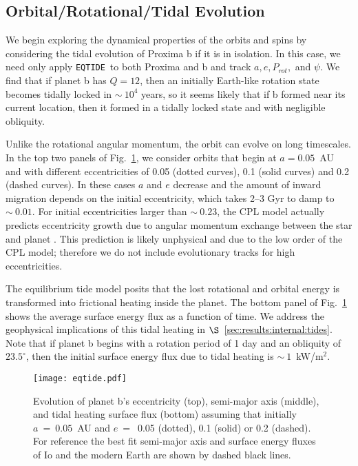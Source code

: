 \documentclass[preprint,12pt]{aastex}
\def\eqtide{\texttt{\footnotesize{EQTIDE}}\xspace}
\begin{document}
\subsection{Orbital/Rotational/Tidal Evolution}
\label{sec:results:orbital}

We begin exploring the dynamical properties of the orbits and spins by
considering the tidal evolution of Proxima b if it is in isolation. In
this case, we need only apply \eqtide~to both Proxima and b and track
$a, e, P_{rot},$ and $\psi$. We find that if planet b has $Q=12$,
then an initially Earth-like rotation state becomes tidally locked in
$\sim~10^4$ years, so it seems likely that if b formed near its
current location, then it formed in a tidally locked state and with
negligible obliquity.

Unlike the rotational angular momentum, the orbit can evolve on long
timescales. In the top two panels of Fig.~\ref{fig:eqtide}, we
consider orbits that begin at $a=0.05$~AU and with different
eccentricities of 0.05 (dotted curves), 0.1 (solid curves) and 0.2
(dashed curves). In these cases $a$ and $e$ decrease and the amount of
inward migration depends on the initial eccentricity, which takes 2--3
Gyr to damp to $\sim~0.01$. For initial eccentricities larger than
$\sim~0.23$, the CPL model actually predicts eccentricity growth due
to angular momentum exchange between the star and planet
\citep{Barnes16}. This prediction is likely unphysical and due to the
low order of the CPL model; therefore we do not include evolutionary
tracks for high eccentricities.

The equilibrium tide model posits that the lost rotational and orbital
energy is transformed into frictional heating inside the planet. The
bottom panel of Fig.~\ref{fig:eqtide} shows the average surface energy
flux as a function of time. We address the geophysical implications of
this tidal heating in $\S$~\ref{sec:results:internal:tides}. Note that if planet
b begins with a rotation period of 1 day and an obliquity of
$23.5^\circ$, then the initial surface energy flux due to tidal
heating is $\sim~1$~kW/m$^{2}$.

\begin{figure} 
\begin{center}
\texttt{[image: eqtide.pdf]}
\end{center}
\caption{Evolution of planet b's eccentricity (top), semi-major axis
  (middle), and tidal heating surface flux (bottom) assuming that
  initially $a~=~0.05$~AU and $e~=$~0.05 (dotted), 0.1 (solid) or 0.2
  (dashed). For reference the best fit semi-major axis and surface
  energy fluxes of Io and the modern Earth are shown by dashed black
  lines.}
\label{fig:eqtide}
\end{figure}
\end{document}
